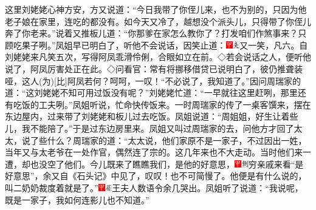 这里刘姥姥心神方安，方又说道：``今日我带了你侄儿来，也不为别的，只因为他老子娘在家里，连吃的都没有。如今天又冷了，越想没个派头儿，只得带了你侄儿奔了你老来。''说着又推板儿道：``你那爹在家怎么教你了？打发咱们作煞事来？只顾吃果子咧。''凤姐早已明白了，听他不会说话，因笑止道：{{\includegraphics[width=3mm]{../Images/00002}\includegraphics[width=3mm]{../Images/00012}\footnotesize \kaishu 又一笑，凡六。自刘姥姥来凡笑五次，写得阿凤乖滑伶俐，合眼如立在前。◇若会说话之人，便听他说了，阿凤厉害处正在此。◇问看官：常有将挪移借贷已说明白了，彼仍推聋装哑，这人{(为)}{[}比{]}阿凤若何？呵呵，一叹！}}``不必说了，我知道了。''因问周瑞家的道：``这刘姥姥不知可用过饭没有呢？''刘姥姥忙道：``一早就往这里赶咧，那里还有吃饭的工夫咧。''凤姐听说，忙命快传饭来。一时周瑞家的传了一桌客馔来，摆在东边屋内，过来带了刘姥姥和板儿过去吃饭。凤姐说道：``周姐姐，好生让着些儿，我不能陪了。''于是过东边房里来。凤姐又叫过周瑞家的去，问他方才回了太太，说了些什么？周瑞家的道：``太太说，他们家原不是一家子，不过因出一姓，当年又与太老爷在一处作官，偶然连了宗的。这几年来也不大走动。当时他们来一遭，却也没空了他们。今儿既来了瞧瞧我们，是他的好意思，{\includegraphics[width=3mm]{../Images/00002}\includegraphics[width=3mm]{../Images/00011}\footnotesize \kaishu 穷亲戚来看``是好意思''，余又自《石头记》中见了，叹叹！}也不可简慢了。他便是有什么说的，叫二奶奶裁度着就是了。''{\includegraphics[width=3mm]{../Images/00002}\includegraphics[width=3mm]{../Images/00010}\footnotesize \kaishu 王夫人数语令余几哭出。}凤姐听了说道：``我说呢，既是一家子，我如何连影儿也不知道。''

